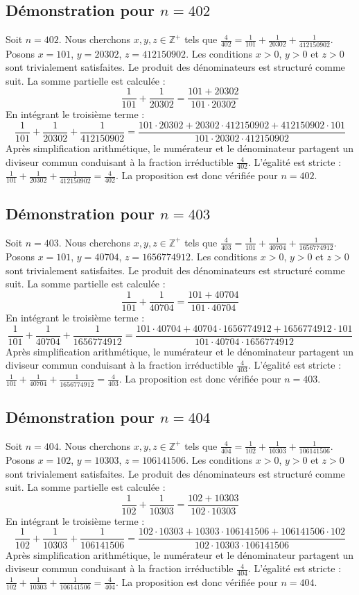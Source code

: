 \documentclass[11pt,a4paper]{article}
\begin{document}
\subsection{Démonstration pour $n = 402$}
Soit $n = 402$. Nous cherchons $x, y, z \in \mathbb{Z}^{+}$ tels que $\frac{4}{402} = \frac{1}{101} + \frac{1}{20302} + \frac{1}{412150902}$.
Posons $x = 101$, $y = 20302$, $z = 412150902$.
Les conditions $x > 0$, $y > 0$ et $z > 0$ sont trivialement satisfaites.
Le produit des dénominateurs est structuré comme suit. La somme partielle est calculée :
$$ \frac{1}{101} + \frac{1}{20302} = \frac{101+20302}{101 \cdot 20302} $$
En intégrant le troisième terme :
$$ \frac{1}{101} + \frac{1}{20302} + \frac{1}{412150902} = \frac{101 \cdot 20302 + 20302 \cdot 412150902 + 412150902 \cdot 101}{101 \cdot 20302 \cdot 412150902} $$
Après simplification arithmétique, le numérateur et le dénominateur partagent un diviseur commun conduisant à la fraction irréductible $\frac{4}{402}$.
L'égalité est stricte : $\frac{1}{101} + \frac{1}{20302} + \frac{1}{412150902} = \frac{4}{402}$.
La proposition est donc vérifiée pour $n = 402$.
\subsection{Démonstration pour $n = 403$}
Soit $n = 403$. Nous cherchons $x, y, z \in \mathbb{Z}^{+}$ tels que $\frac{4}{403} = \frac{1}{101} + \frac{1}{40704} + \frac{1}{1656774912}$.
Posons $x = 101$, $y = 40704$, $z = 1656774912$.
Les conditions $x > 0$, $y > 0$ et $z > 0$ sont trivialement satisfaites.
Le produit des dénominateurs est structuré comme suit. La somme partielle est calculée :
$$ \frac{1}{101} + \frac{1}{40704} = \frac{101+40704}{101 \cdot 40704} $$
En intégrant le troisième terme :
$$ \frac{1}{101} + \frac{1}{40704} + \frac{1}{1656774912} = \frac{101 \cdot 40704 + 40704 \cdot 1656774912 + 1656774912 \cdot 101}{101 \cdot 40704 \cdot 1656774912} $$
Après simplification arithmétique, le numérateur et le dénominateur partagent un diviseur commun conduisant à la fraction irréductible $\frac{4}{403}$.
L'égalité est stricte : $\frac{1}{101} + \frac{1}{40704} + \frac{1}{1656774912} = \frac{4}{403}$.
La proposition est donc vérifiée pour $n = 403$.
\subsection{Démonstration pour $n = 404$}
Soit $n = 404$. Nous cherchons $x, y, z \in \mathbb{Z}^{+}$ tels que $\frac{4}{404} = \frac{1}{102} + \frac{1}{10303} + \frac{1}{106141506}$.
Posons $x = 102$, $y = 10303$, $z = 106141506$.
Les conditions $x > 0$, $y > 0$ et $z > 0$ sont trivialement satisfaites.
Le produit des dénominateurs est structuré comme suit. La somme partielle est calculée :
$$ \frac{1}{102} + \frac{1}{10303} = \frac{102+10303}{102 \cdot 10303} $$
En intégrant le troisième terme :
$$ \frac{1}{102} + \frac{1}{10303} + \frac{1}{106141506} = \frac{102 \cdot 10303 + 10303 \cdot 106141506 + 106141506 \cdot 102}{102 \cdot 10303 \cdot 106141506} $$
Après simplification arithmétique, le numérateur et le dénominateur partagent un diviseur commun conduisant à la fraction irréductible $\frac{4}{404}$.
L'égalité est stricte : $\frac{1}{102} + \frac{1}{10303} + \frac{1}{106141506} = \frac{4}{404}$.
La proposition est donc vérifiée pour $n = 404$.
\end{document}
